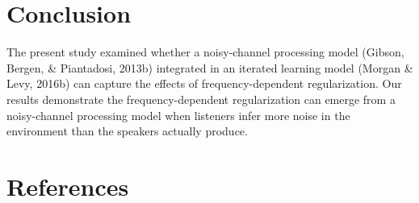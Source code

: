 \documentclass[10pt, letterpaper]{article}
\begin{document}
\hypertarget{conclusion}{%
\section{Conclusion}\label{conclusion}}

The present study examined whether a noisy-channel processing model
(Gibson, Bergen, \& Piantadosi, 2013b) integrated in an iterated
learning model (Morgan \& Levy, 2016b) can capture the effects of
frequency-dependent regularization. Our results demonstrate the
frequency-dependent regularization can emerge from a noisy-channel
processing model when listeners infer more noise in the environment than
the speakers actually produce.

\hypertarget{references}{%
\section{References}\label{references}}

\setlength{\parindent}{-0.1in} 
\setlength{\leftskip}{0.125in}

\noindent
\end{document}
